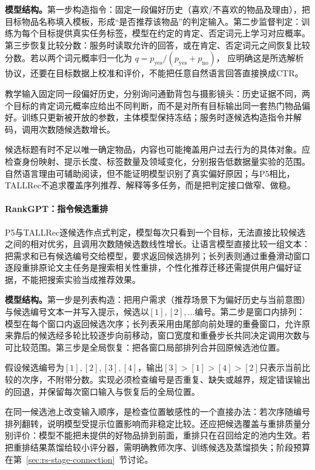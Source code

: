 \textbf{模型结构。}第一步构造指令：固定一段偏好历史（喜欢/不喜欢的物品及理由），把目标物品名称填入模板，形成“是否推荐该物品”的判定输入。第二步监督判定：训练为每个目标提供真实任务标签，模型在约定的肯定、否定词元上学习对应概率。第三步恢复比较分数：服务时读取允许的回答，或在肯定、否定词元之间恢复比较分数。若以两个词元概率归一化为
$q=p_{\mathrm{yes}}/(p_{\mathrm{yes}}+p_{\mathrm{no}})$，
应明确这是所选解析协议，还要在目标数据上校准和评价，不能把任意自然语言回答直接换成CTR。

教学输入固定同一段偏好历史，分别询问通勤背包与摄影镜头：历史证据不同，两个目标的肯定词元概率应给出不同判断，而不是对所有目标输出同一套热门物品偏好。训练只更新被开放的参数，主体模型保持冻结；服务时逐候选构造指令并解码，调用次数随候选数增长。

候选标题有时不足以唯一确定物品，内容也可能掩盖用户过去行为的具体对象。应检查身份映射、提示长度、标签数量及领域变化，分别报告低数据量实验的范围。自然语言理由可辅助阅读，但不能证明模型识别了真实偏好原因；与P5相比，TALLRec不追求覆盖序列推荐、解释等多任务，而是把判定接口做窄、做稳。

\paragraph{RankGPT：指令候选重排}
\label{sec:rs-rankgpt}

P5与TALLRec逐候选作点式判定，模型每次只看到一个目标，无法直接比较候选之间的相对优劣，且调用次数随候选数线性增长。让语言模型直接比较一组文本：把需求和已有候选编号交给模型，要求返回候选排列；长列表则通过重叠滑动窗口逐段重排原论文主任务是搜索相关性重排，个性化推荐迁移还需提供用户偏好证据，不能把搜索实验当成推荐效果。

\textbf{模型结构。}第一步是列表构造：把用户需求（推荐场景下为偏好历史与当前意图）与候选编号文本一并写入提示，候选以$[1],[2],\ldots$编号。第二步是窗口内排列：模型在每个窗口内返回候选次序；长列表采用由尾部向前处理的重叠窗口，允许原来靠后的候选经多轮比较逐步向前移动，窗口宽度和重叠步长共同决定调用次数与可比较范围。第三步是全局恢复：把各窗口局部排列合并回原候选池位置。

假设候选编号为$[1],[2],[3],[4]$，输出$[3]>[1]>[4]>[2]$只表示当前比较的次序，不附带分数。实现必须检查编号是否重复、缺失或越界，规定错误输出的回退，并保留每次窗口输入与恢复后的全局位置。

在同一候选池上改变输入顺序，是检查位置敏感性的一个直接办法：若次序随编号排列翻转，说明模型受提示位置影响而非稳定比较。还应把候选覆盖与重排质量分别评价：模型不能把未提供的好物品排到前面，重排只在召回给定的池内生效。若把重排结果蒸馏给较小评分器，需明确教师次序、训练候选及蒸馏损失；阶段预算在第~\ref{sec:rs-stage-connection}~节讨论。

